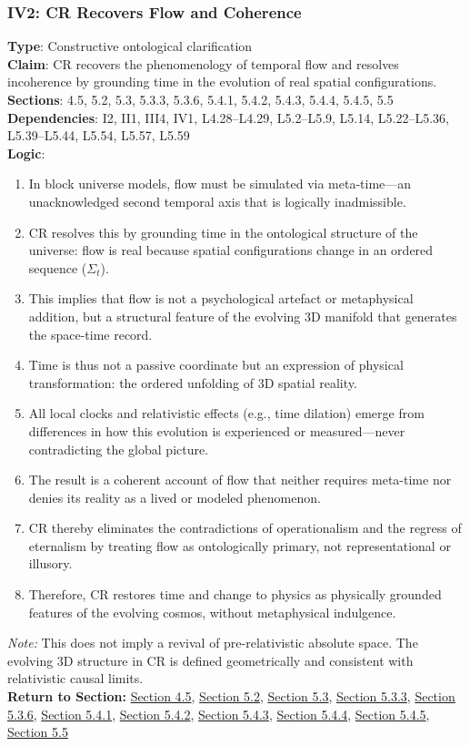 \documentclass[12pt]{book}
\begin{document}
\subsubsection*{IV2: CR Recovers Flow and Coherence}
\label{appendix:IV2}
\textbf{Type}: Constructive ontological clarification\\
\textbf{Claim}: CR recovers the phenomenology of temporal flow and resolves incoherence by grounding time in the evolution of real spatial configurations.\\
\textbf{Sections}: 4.5, 5.2, 5.3, 5.3.3, 5.3.6, 5.4.1, 5.4.2, 5.4.3, 5.4.4, 5.4.5, 5.5\\
\textbf{Dependencies}: I2, II1, III4, IV1, L4.28–L4.29, L5.2–L5.9, L5.14, L5.22–L5.36, L5.39–L5.44, L5.54, L5.57, L5.59\\
\textbf{Logic}:
\begin{enumerate}
    \item In block universe models, flow must be simulated via meta-time---an unacknowledged second temporal axis that is logically inadmissible.
    \item CR resolves this by grounding time in the ontological structure of the universe: flow is real because spatial configurations change in an ordered sequence (\(\Sigma_t\)).
    \item This implies that flow is not a psychological artefact or metaphysical addition, but a structural feature of the evolving 3D manifold that generates the space-time record.
    \item Time is thus not a passive coordinate but an expression of physical transformation: the ordered unfolding of 3D spatial reality.
    \item All local clocks and relativistic effects (e.g., time dilation) emerge from differences in how this evolution is experienced or measured---never contradicting the global picture.
    \item The result is a coherent account of flow that neither requires meta-time nor denies its reality as a lived or modeled phenomenon.
    \item CR thereby eliminates the contradictions of operationalism and the regress of eternalism by treating flow as ontologically primary, not representational or illusory.
    \item Therefore, CR restores time and change to physics as physically grounded features of the evolving cosmos, without metaphysical indulgence.
\end{enumerate}
\textit{Note:} This does not imply a revival of pre-relativistic absolute space. The evolving 3D structure in CR is defined geometrically and consistent with relativistic causal limits.\\
\textbf{Return to Section:} \hyperref[sec:4.5]{Section 4.5}, \hyperref[sec:5.2]{Section 5.2}, \hyperref[sec:5.3]{Section 5.3}, \hyperref[sec:5.3.3]{Section 5.3.3}, \hyperref[sec:5.3.6]{Section 5.3.6}, \hyperref[sec:5.4.1]{Section 5.4.1}, \hyperref[sec:5.4.2]{Section 5.4.2}, \hyperref[sec:5.4.3]{Section 5.4.3}, \hyperref[sec:5.4.4]{Section 5.4.4}, \hyperref[sec:5.4.5]{Section 5.4.5}, \hyperref[sec:5.5]{Section 5.5}
\end{document}
